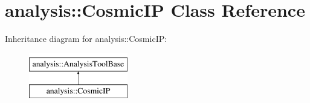 \hypertarget{classanalysis_1_1CosmicIP}{}\section{analysis\+:\+:Cosmic\+IP Class Reference}
\label{classanalysis_1_1CosmicIP}
Inheritance diagram for analysis\+:\+:Cosmic\+IP\+:\begin{figure}[H]
\begin{center}
\leavevmode
\includegraphics[height=2.000000cm]{classanalysis_1_1CosmicIP}
\end{center}
\end{figure}
